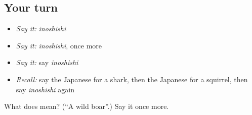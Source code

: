 \subsection*{Your turn}
\begin{itemize}
\raggedright
  \item \emph{Say it:} \emph{inoshishi}
  \item \emph{Say it:} \emph{inoshishi}, once more
  \item \emph{Say it:} say \emph{inoshishi}
  \item \emph{Recall:} say the Japanese for a shark, then the Japanese for a squirrel, then say \emph{inoshishi} again
\end{itemize}

\begin{tcolorbox}[breakable,colback=teal!4,colframe=teal!35!black,title={Before you move on}]
What does  mean? (\textquotedblleft{}A wild boar\textquotedblright{}.) Say it once more.
\end{tcolorbox}
